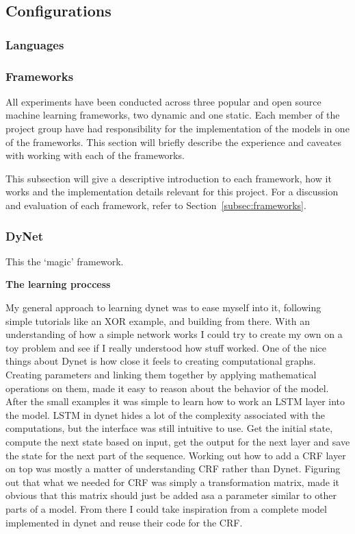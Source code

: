 
\subsection{Configurations}


\subsubsection{Languages}


\subsubsection{Frameworks}

All experiments have been conducted across three popular and open source machine
learning frameworks, two dynamic and one static. Each member of the project
group have had responsibility for the implementation of the models in one of the
frameworks. This section will briefly describe the experience and caveates with
working with each of the frameworks.

This subsection will give a descriptive introduction to each framework, how it
works and the implementation details relevant for this project. For a discussion
and evaluation of each framework, refer to Section~\ref{subsec:frameworks}.


\subsubsection*{DyNet}

This the `magic' framework.


\textbf{The learning proccess}

My general approach to learning dynet was to ease myself into it, following
simple tutorials like an XOR example, and building from there.
With an understanding of how a simple network works I could try to create my own
on a toy problem and see if I really understood how stuff worked.
One of the nice things about Dynet is how close it feels to creating
computational graphs.
Creating parameters and linking them together by applying mathematical
operations on them, made it easy to reason about the behavior of the model.
After the small examples it was simple to learn how to work an LSTM layer into
the model.
LSTM in dynet hides a lot of the complexity associated with the computations,
but the interface was still intuitive to use.
Get the initial state, compute the next state based on input, get the output for
the next layer and save the state for the next part of the sequence.
Working out how to add a CRF layer on top was mostly a matter of understanding
CRF rather than Dynet. 
Figuring out that what we needed for CRF was simply a transformation matrix,
made it obvious that this matrix should just be added asa a parameter similar to
other parts of a model.
From there I could take inspiration from a complete model implemented in dynet
and reuse their code for the CRF.\

